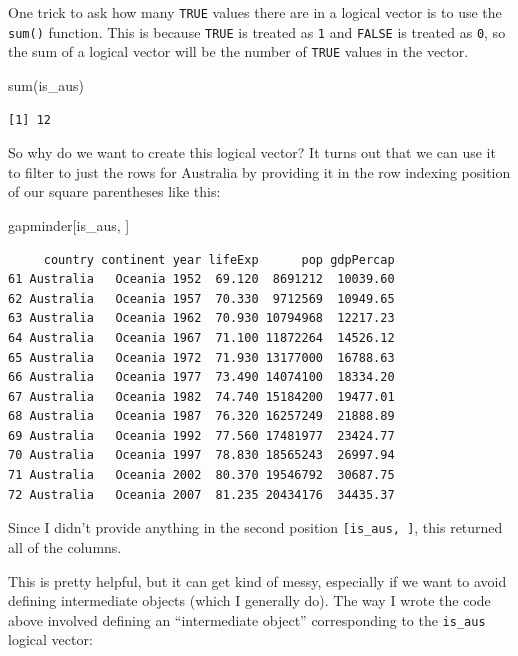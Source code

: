 \documentclass[
  letterpaper,
  DIV=11,
  numbers=noendperiod]{scrreprt}
\newenvironment{Shaded}{\begin{snugshade}}{\end{snugshade}}
\newcommand{\FunctionTok}[1]{\textcolor[rgb]{0.28,0.35,0.67}{#1}}
\newcommand{\NormalTok}[1]{\textcolor[rgb]{0.00,0.23,0.31}{#1}}
\begin{document}
One trick to ask how many \texttt{TRUE} values there are in a logical
vector is to use the \texttt{sum()} function. This is because
\texttt{TRUE} is treated as \texttt{1} and \texttt{FALSE} is treated as
\texttt{0}, so the sum of a logical vector will be the number of
\texttt{TRUE} values in the vector.

\begin{Shaded}
\begin{Highlighting}[]
\FunctionTok{sum}\NormalTok{(is\_aus)}
\end{Highlighting}
\end{Shaded}

\begin{verbatim}
[1] 12
\end{verbatim}

So why do we want to create this logical vector? It turns out that we
can use it to filter to just the rows for Australia by providing it in
the row indexing position of our square parentheses like this:

\begin{Shaded}
\begin{Highlighting}[]
\NormalTok{gapminder[is\_aus, ]}
\end{Highlighting}
\end{Shaded}

\begin{verbatim}
     country continent year lifeExp      pop gdpPercap
61 Australia   Oceania 1952  69.120  8691212  10039.60
62 Australia   Oceania 1957  70.330  9712569  10949.65
63 Australia   Oceania 1962  70.930 10794968  12217.23
64 Australia   Oceania 1967  71.100 11872264  14526.12
65 Australia   Oceania 1972  71.930 13177000  16788.63
66 Australia   Oceania 1977  73.490 14074100  18334.20
67 Australia   Oceania 1982  74.740 15184200  19477.01
68 Australia   Oceania 1987  76.320 16257249  21888.89
69 Australia   Oceania 1992  77.560 17481977  23424.77
70 Australia   Oceania 1997  78.830 18565243  26997.94
71 Australia   Oceania 2002  80.370 19546792  30687.75
72 Australia   Oceania 2007  81.235 20434176  34435.37
\end{verbatim}

Since I didn't provide anything in the second position
\texttt{{[}is\_aus,\ {]}}, this returned all of the columns.

This is pretty helpful, but it can get kind of messy, especially if we
want to avoid defining intermediate objects (which I generally do). The
way I wrote the code above involved defining an ``intermediate object''
corresponding to the \texttt{is\_aus} logical vector:
\end{document}
